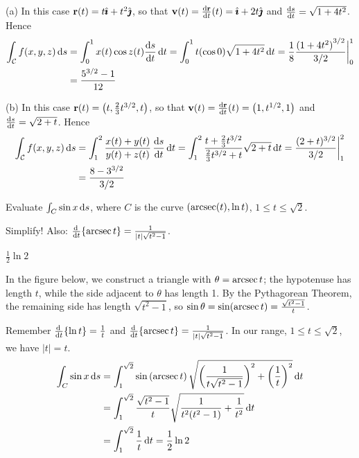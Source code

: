 \begin{solution}
(a) 
In this case $\mathbf{r}(t)=t\hat{\pmb{\imath}}+t^2\hat{\pmb{\jmath}}$, so that
$\vv(t)=\diff{\vr}{t}(t)=\hi+2t\hj$ and $\diff{s}{t}=\sqrt{1+4t^2} $. Hence
\begin{align*}
\int_\cC f(x,y,z)\,\dee{s}
&=\int_0^1 x(t)\cos z(t) \diff{s}{t}\,\dee{t}
=\int_0^1 t(\cos 0) \sqrt{1+4t^2}\,\dee{t}
=\frac{1}{8}\frac{ {(1+4t^2)}^{3/2}}{3/2}\bigg|_0^1\\
&=\frac{5^{3/2}-1}{12}
\end{align*}

(b) In this case $\mathbf{r}(t)=\big(t,\frac{2}{3}t^{3/2},t\big)$, so
that
$\vv(t)=\diff{\vr}{t}(t)=\big(1,t^{1/2},1\big)$ and 
$\diff{s}{t}=\sqrt{2+t} $. Hence
\begin{align*}
\int_\cC f(x,y,z)\,\dee{s}
&=\int_1^2 \frac{x(t)+y(t)}{y(t)+z(t)} \, \diff{s}{t}\,\dee{t}
=\int_1^2 \frac{t+{2\over 3}t^{3/2}}{{2\over3}t^{3/2}+t} \sqrt{2+t}\,\dee{t}
=\frac{(2+t)^{3/2}}{3/2}\bigg|_1^2 \\
&=\frac{8-3^{3/2}}{3/2}
\end{align*}	

\end{solution}



\begin{question}
	Evaluate $\int_C \sin x\,\mathrm{d}s$, where $C$ is the curve $(\mathop{\mathrm{arcsec}}(t), \ln t)$, $1 \le t \le \sqrt{2}$. 
\end{question}
\begin{hint}
	Simplify! Also: $\diff{}{t}\{\arcsec t\} = \frac{1}{|t|\sqrt{t^2-1}}$.
\end{hint}
\begin{answer}
	$\frac12 \ln 2$
\end{answer}
\begin{solution}
  In the figure below, we construct a triangle with $\theta=\mathop{\mathrm{arcsec}} t$; the hypotenuse has length $t$, while the side adjacent to $\theta$ has length 1. By the Pythagorean Theorem, the remaining side has length $\sqrt{t^2-1}$, so $\sin\theta=\sin(\mathop{\mathrm{arcsec}} t)=\frac{\sqrt{t^2-1}}{t}$.
               \begin{center}
\end{center}
Remember $\diff{}{t}\{\ln t\} = \frac{1}{t}$ and $\diff{}{t}\{\arcsec t\} = \frac{1}{|t|\sqrt{t^2-1}}$. In our range, $1 \le t \le \sqrt 2$, we have $|t|=t$.
	\begin{align*}
		\int_C \sin x \,\mathrm{d}s&=\int_{1}^{\sqrt 2}\sin\left(\mathop{\mathrm{arcsec}} t \right)\sqrt{\left(\frac{1}{t\sqrt{t^2-1}} \right)^2+\left(\frac1t \right)^2}\,\mathrm{d}t\\
		&=\int_1^{\sqrt{2}} \frac{\sqrt{t^2-1}}{t}\sqrt{\frac{1}{t^2(t^2-1)}+\frac{1}{t^2}} \,\mathrm{d}t\\
		&=\int_1^{\sqrt 2}\frac1t\,\mathrm{d}t=\frac{1}{2}\ln 2
	\end{align*}
\end{solution}


